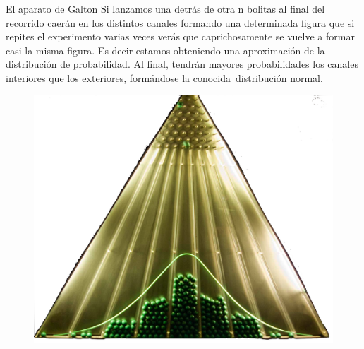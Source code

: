 \begin{myexampleblock}{El aparato de Galton}
\vspace{2mm} Si lanzamos una detrás de otra n bolitas al final del recorrido caerán en los distintos canales formando una determinada figura que si repites el experimento varias veces verás que caprichosamente se vuelve a formar casi la misma figura. Es decir estamos obteniendo una aproximación de la distribución de probabilidad. Al final, tendrán mayores probabilidades los canales interiores que los exteriores, formándose la conocida distribución normal.

	\begin{figure}[H]
	\centering
	\includegraphics[width=.9\textwidth]{imagenes/imagenes04/T04IM41.png}
	\end{figure}

	
\end{myexampleblock}
	
